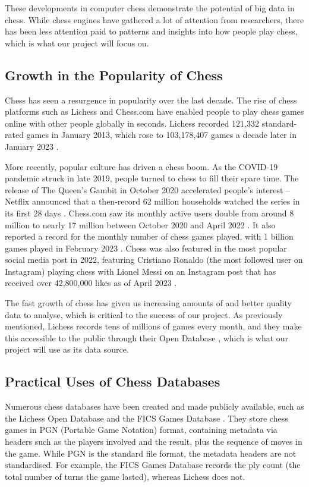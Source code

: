 \documentclass[a4paper, 11pt]{article}
\begin{document}
These developments in computer chess demonstrate the potential of big data in chess. While chess engines have gathered a lot of attention from researchers, there has been less attention paid to patterns and insights into how people play chess, which is what our project will focus on.

\subsection{Growth in the Popularity of Chess}
Chess has seen a resurgence in popularity over the last decade. The rise of chess platforms such as Lichess and Chess.com have enabled people to play chess games online with other people globally in seconds. Lichess recorded 121,332 standard-rated games in January 2013, which rose to 103,178,407 games a decade later in January 2023 \cite{lichessOpenDatabase}. 

More recently, popular culture has driven a chess boom. As the COVID-19 pandemic struck in late 2019, people turned to chess to fill their spare time. The release of The Queen's Gambit in October 2020 accelerated people's interest -- Netflix announced that a then-record 62 million households watched the series in its first 28 days \cite{chessIsBooming}. Chess.com saw its monthly active users double from around 8 million to nearly 17 million between October 2020 and April 2022 \cite{chessIsBooming}. It also reported a record for the monthly number of chess games played, with 1 billion games played in February 2023 \cite{chessCom1BillionGamesInFebruary}. Chess was also featured in the most popular social media post in 2022, featuring Cristiano Ronaldo (the most followed user on Instagram) playing chess with Lionel Messi on an Instagram post that has received over 42,800,000 likes as of April 2023 \cite{ronaldoMessiChess}.

The fast growth of chess has given us increasing amounts of and better quality data to analyse, which is critical to the success of our project. As previously mentioned, Lichess records tens of millions of games every month, and they make this accessible to the public through their Open Database \cite{lichessOpenDatabase}, which is what our project will use as its data source.

\subsection{Practical Uses of Chess Databases}
Numerous chess databases have been created and made publicly available, such as the Lichess Open Database \cite{lichessOpenDatabase} and the FICS Games Database \cite{ficsGamesDatabase}. They store chess games in PGN (Portable Game Notation) format, containing metadata via headers such as the players involved and the result, plus the sequence of moves in the game. While PGN is the standard file format, the metadata headers are not standardised. For example, the FICS Games Database records the ply count (the total number of turns the game lasted), whereas Lichess does not.
\end{document}

